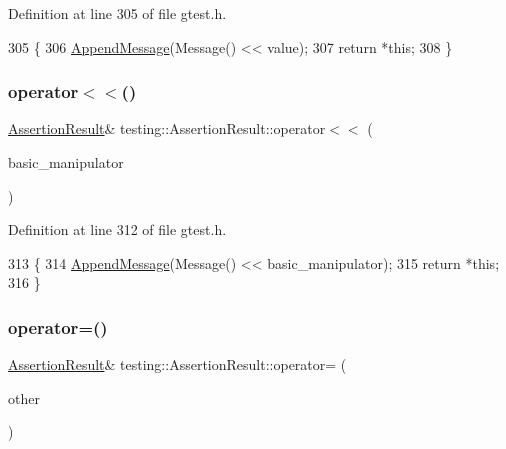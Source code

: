 Definition at line 305 of file gtest.\+h.


\begin{DoxyCode}
305                                                                     \{
306     \hyperlink{classtesting_1_1AssertionResult_a5b55e01f1321d744a594dbe51d46a139}{AppendMessage}(Message() << value);
307     \textcolor{keywordflow}{return} *\textcolor{keyword}{this};
308   \}
\end{DoxyCode}
\mbox{\label{classtesting_1_1AssertionResult_a43ae8a260843ce2ff3dc9af262672b8b}} 
\subsubsection{\texorpdfstring{operator$<$$<$()}{operator<<()}\hspace{0.1cm}{\footnotesize\ttfamily [2/2]}}
{\footnotesize\ttfamily \hyperlink{classtesting_1_1AssertionResult}{Assertion\+Result}\& testing\+::\+Assertion\+Result\+::operator$<$$<$ (\begin{DoxyParamCaption}\item[{\+::std\+::ostream \&($\ast$)(\+::std\+::ostream \&stream)}]{basic\+\_\+manipulator }\end{DoxyParamCaption})\hspace{0.3cm}{\ttfamily [inline]}}



Definition at line 312 of file gtest.\+h.


\begin{DoxyCode}
313                                                             \{
314     \hyperlink{classtesting_1_1AssertionResult_a5b55e01f1321d744a594dbe51d46a139}{AppendMessage}(Message() << basic\_manipulator);
315     \textcolor{keywordflow}{return} *\textcolor{keyword}{this};
316   \}
\end{DoxyCode}
\mbox{\label{classtesting_1_1AssertionResult_aad9274c7b69eda67eb9306963a790839}} 
\subsubsection{\texorpdfstring{operator=()}{operator=()}}
{\footnotesize\ttfamily \hyperlink{classtesting_1_1AssertionResult}{Assertion\+Result}\& testing\+::\+Assertion\+Result\+::operator= (\begin{DoxyParamCaption}\item[{\hyperlink{classtesting_1_1AssertionResult}{Assertion\+Result}}]{other }\end{DoxyParamCaption})\hspace{0.3cm}{\ttfamily [inline]}}



